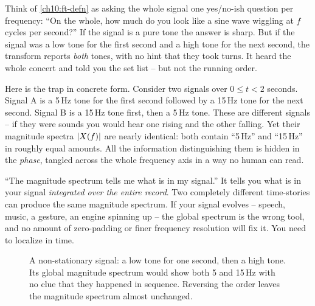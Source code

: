 \begin{intuitionbox}
Think of \eqref{ch10:ft-defn} as asking the whole signal one yes/no-ish question
per frequency: ``On the whole, how much do you look like a sine wave wiggling at
$f$ cycles per second?'' If the signal is a pure tone the answer is sharp. But if
the signal was a low tone for the first second and a high tone for the next
second, the transform reports \emph{both} tones, with no hint that they took
turns. It heard the whole concert and told you the set list -- but not the
running order.
\end{intuitionbox}

Here is the trap in concrete form. Consider two signals over $0 \le t < 2$
seconds. Signal A is a 5\,Hz tone for the first second followed by a 15\,Hz tone
for the next second. Signal B is a 15\,Hz tone first, then a 5\,Hz tone. These
are different signals -- if they were sounds you would hear one rising
and the other falling. Yet their magnitude spectra $\lvert X(f)\rvert$ are nearly
identical: both contain ``5\,Hz'' and ``15\,Hz'' in roughly equal amounts. All
the information distinguishing them is hidden in the \emph{phase}, tangled across
the whole frequency axis in a way no human can read.

\begin{trapbox}
``The magnitude spectrum tells me what is in my signal.'' It tells you what is in
your signal \emph{integrated over the entire record}. Two completely different
time-stories can produce the same magnitude spectrum. If your signal evolves --
speech, music, a gesture, an engine spinning up -- the global spectrum is the
wrong tool, and no amount of zero-padding or finer frequency resolution will fix
it. You need to localize in time.
\end{trapbox}

\begin{figure}[H]
\centering
{}
\caption{A non-stationary signal: a low tone for one second, then a high tone.
Its global magnitude spectrum would show both 5 and 15\,Hz with no clue that they
happened in sequence. Reversing the order leaves the magnitude spectrum almost
unchanged.}
\label{ch10:fig-nonstationary}
\end{figure}

